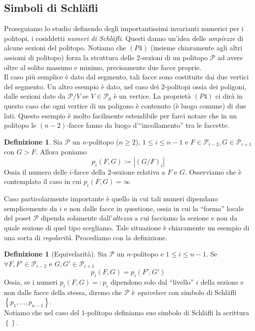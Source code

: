 \documentclass[a4paper,12pt]{report}
\newcommand{\p}{\mathcal{P}}
\theoremstyle{plain}
\theoremstyle{definition}
\newtheorem{defin}[teo]{Definizione}
\begin{document}
\subsection{Simboli di Schl\"afli}
Proseguiamo lo studio definendo degli importantissimi invarianti numerici per i politopi, i cosiddetti \emph{numeri di Schl\"afli}. Questi danno un'idea
delle \emph{ampiezze} di alcune sezioni del politopo.
Notiamo che $(P4)$ (insieme chiaramente agli altri assiomi di politopo) forza la struttura delle $2$-sezioni di un politopo $\p$ ad avere oltre al solito
 massimo e minimo, precisamente due facce proprie.\\
Il caso pi\`u semplice \`e dato dal segmento, tali facce sono costituite dai due vertici del segmento. Un altro esempio \`e dato, nel caso dei $2$-politopi
ossia dei poligoni, dalle sezioni date da $\p/V$ se $V\in\p_0$ \`e un vertice. La propriet\`a $(P4)$ ci dir\`a in questo caso che ogni vertice di un
 poligono \`e contenuto (\`e luogo comune) di due lati. Questo esempio \`e molto facilmente estendibile per farci notare che in un politopo le $(n-2)$-facce
fanno da luogo d'``incollamento'' tra le faccette.\\
\begin{defin}
Sia $\p$ un $n$-politopo ($n\geq 2$), $1\leq i\leq n-1$ e $F\in\p_{i-2}, G\in\p_{i+1}$ con $G>F$. Allora poniamo
\begin{equation*}
p_i(F,G):=\left|(G/F)_i\right|
\end{equation*}
Ossia il numero delle $i$-facce della $2$-sezione relativa a $F$ e $G$. Osserviamo che \`e contemplato il caso in cui $p_i(F,G)=\infty$
\end{defin}
Caso particolarmente importante \`e quello in cui tali numeri dipendano semplicemente da $i$ e non dalle facce in questione, ossia in cui la ``forma''
locale del poset $\p$ dipenda solamente dall'\emph{altezza} a cui facciamo la sezione e non da quale sezione di quel tipo scegliamo. Tale situazione
\`e chiaramente un esempio di una sorta di \emph{regolarit\`a}. Procediamo con la definizione.
\begin{defin}[Equivelarit\`a]
Sia $\p$ un $n$-politopo e $1\leq i\leq n-1$. Se $\forall F,F'\in\p_{i-2}$ e $G,G'\in\p_{i+1}$
\begin{equation*}
p_i(F,G)=p_i(F',G')
\end{equation*}
Ossia, se i numeri $p_i(F,G)=:p_i$ dipendono solo dal ``livello'' $i$ della sezione e non dalle facce della stessa, diremo che $\p$ \`e \emph{equivelare}
con simbolo di Schl\"afli $\left\{p_1,\dots,p_{n-1}\right\}$.\\
Notiamo che nel caso del $1$-politopo definiamo suo simbolo di Schl\"afli la scrittura $\left\{\right\}$.
\end{defin} 
\end{document}
